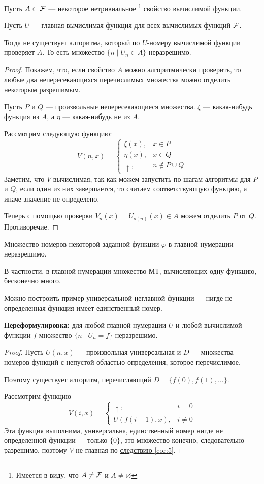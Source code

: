 \begin{thm}
	Пусть $ A \subset \mathcal{F}$ --- некоторое нетривиальное \footnote{Имеется в виду, что $ A \ne \mathcal{F}$ и $ A \ne \varnothing$ } свойство вычислимой функции.

	Пусть $ U$ --- главная вычислимая функция для всех вычислимых функций $ \mathcal{F}$.

	Тогда не существует алгоритма, который по  $ U$-номеру вычислимой функции проверяет $ A$. То есть множество $ \{n \mid U_n \in A\}$ неразрешимо.
\end{thm}
\begin{proof}
    Покажем, что, если свойство $ A$ можно алгоритмически проверить, то любые два непересекающихся перечислимых множества можно отделить некоторым разрешимым.

	Пусть $ P$ и $ Q$ --- произвольные непересекающиеся множества. $ \xi$ --- какая-нибудь функция из $ A$, а $ \eta$ --- какая-нибудь не из $ A$.

	Рассмотрим следующую функцию:
	\[
		V(n, x) = 
		\begin{cases}
			\xi(x), & x \in P \\
			\eta(x), & x \in Q \\
			\uparrow, & n \notin P \cup Q
		\end{cases}
	\] 
	Заметим, что $ V$ вычислимая, так как можем запустить по шагам алгоритмы для $ P$ и $ Q$, если один из них завершается, то считаем соответствующую функцию, а иначе значение не определено.

	Теперь с помощью проверки  $ V_n(x) = U_{s(n)}(x) \in  A$ можем отделить $ P$ от $ Q$. Противоречие. 
\end{proof}
\begin{cor}
    Множество номеров некоторой заданной функции $ \varphi $ в главной нумерации неразрешимо.

	В частности, в главной нумерации множество МТ, вычисляющих одну функцию, бесконечно много.
\end{cor}
\begin{cor}\label{cor:5}
    Можно построить пример универсальной неглавной функции --- нигде не определенная функция имеет единственный номер.

	\noindent
	\textbf{Переформулировка:} для любой главной нумерации $ U$ и любой вычислимой функции $ f$  множество $ \{n \mid U_n = f\}$ неразрешимо.
\end{cor}
\begin{proof}
	Пусть $ U(n, x)$ --- произвольная универсальная и $ D$ --- множества номеров функций с непустой областью определения, которое  перечислимое.

	Поэтому существует алгоритм, перечисляющий $ D = \{f(0), f(1), \ldots \}$.

	Рассмотрим функцию
	\[
		V(i, x) = \begin{cases}
			\uparrow, & i = 0 \\
			U(f(i-1), x), & i \ne 0
		\end{cases}
	\] 
	Эта функция выполнима, универсальна, единственный номер нигде не определенной функции --- только $ \{0\}$,  это множество конечно, следовательно разрешимо, поэтому $ V$ не главная по \href{cor:5}{следствию \ref{cor:5}}. 
\end{proof}


